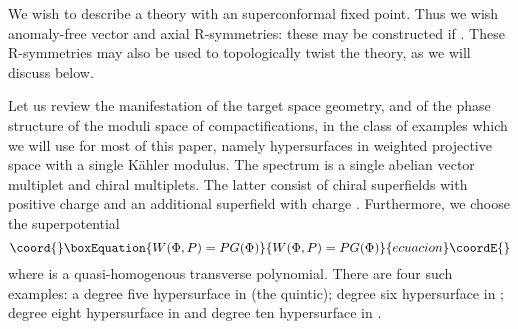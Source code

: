 \documentclass[a4paper,12pt]{article}
\begin{document}
We wish to describe a theory with an \coordHE{} superconformal fixed point. 
Thus we wish anomaly-free vector and axial \coordHE{} R-symmetries: these may
be constructed if \coordHE{} \cite{wittenphases}.  These
R-symmetries may also be used to topologically twist the theory, as we
will discuss below. 

Let us review the manifestation of the target space geometry, and of the
phase structure of the moduli space of compactifications, 
in the class of examples 
which we will use for most of this paper, namely hypersurfaces
in weighted projective space with a single K\"ahler modulus.
The spectrum is a single abelian vector multiplet and \coordHE{} chiral
multiplets. The latter consist of \coordHE{} chiral superfields \coordHE{} with
positive charge \coordHE{} and an additional superfield \coordHE{}
with charge \coordHE{}. Furthermore, we choose the 
superpotential
\begin{equation}\coord{}\boxEquation{
	W(\Phi,P) = P G(\Phi)
}{
	W(\Phi,P) = P G(\Phi)
}{ecuacion}\coordE{}\end{equation}
where \coordHE{} is a quasi-homogenous  transverse polynomial. There
are four such examples:
a degree five hypersurface in \coordHE{} 
(the quintic); degree six hypersurface in \coordHE{};
degree eight hypersurface in \coordHE{} 
and degree ten hypersurface in \coordHE{}. 
\end{document}

